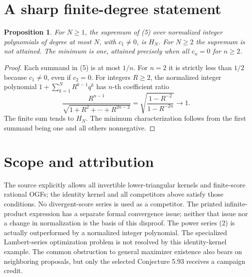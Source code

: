 \documentclass[11pt]{article}
\newtheorem{proposition}{Proposition}
\begin{document}
\section*{A sharp finite-degree statement}
\begin{proposition}
For \(N\geq1\), the supremum of (5) over normalized integer
polynomials of degree at most \(N\), with \(c_1\ne0\), is \(H_N\).
For \(N\geq2\) the supremum is not attained. The minimum is one,
attained precisely when all \(c_n=0\) for \(n\geq2\).
\end{proposition}
\begin{proof}
Each summand in (5) is at most \(1/n\). For \(n=2\) it is strictly
less than \(1/2\) because \(c_1\ne0\), even if \(c_2=0\).
For integers \(R\geq2\), the normalized integer polynomial
\(1+\sum_{k=1}^N R^{k-1}q^k\) has \(n\)-th coefficient ratio
\[
 \frac{R^{n-1}}{\sqrt{1+R^2+\cdots+R^{2n-2}}}
   =\sqrt{\frac{1-R^{-2}}{1-R^{-2n}}}\longrightarrow1 .
\]
The finite sum tends to \(H_N\). The minimum characterization
follows from the first summand being one and all others nonnegative.
\end{proof}

\section*{Scope and attribution}
The source explicitly allows all invertible lower-triangular kernels
and finite-score rational OGFs; the identity kernel and all
competitors above satisfy those conditions.
No divergent-score series is used as a competitor.
The printed infinite-product expression has a separate formal
convergence issue; neither that issue nor a change in normalization
is the basis of this disproof. The power series (2) is actually
outperformed by a normalized integer polynomial.
The specialized Lambert-series optimization problem is not resolved
by this identity-kernel example. The common obstruction to general
maximizer existence also bears on neighboring proposals, but only
the selected Conjecture 5.93 receives a campaign credit.
\end{document}
